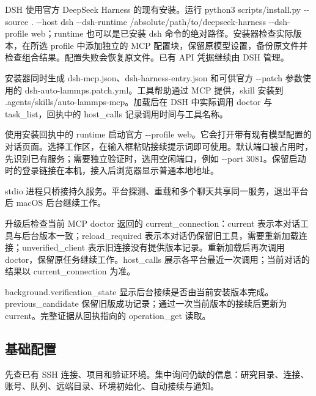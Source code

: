 \documentclass[11pt,a4paper]{ctexart}
\begin{document}
DSH 使用官方 DeepSeek Harness 的现有安装。运行 python3 scripts/\allowbreak{}install.py -{}-source . -{}-host dsh -{}-dsh-runtime /\allowbreak{}absolute/\allowbreak{}path/\allowbreak{}to/\allowbreak{}deepseek-harness -{}-dsh-profile web；runtime 也可以是已安装 dsh 命令的绝对路径。安装器检查实际版本，在所选 profile 中添加独立的 MCP 配置块，保留原模型设置，备份原文件并检查组合结果。配置失败会恢复原文件。已有 API 凭据继续由 DSH 管理。



安装器同时生成 dsh-mcp.json、dsh-harness-entry.json 和可供官方 -{}-patch 参数使用的 dsh-auto-lammps.patch.yml。工具帮助通过 MCP 提供，skill 安装到 .agents/\allowbreak{}skills/\allowbreak{}auto-lammps-mcp。加载后在 DSH 中实际调用 doctor 与 task\_\allowbreak{}list，回执中的 host\_\allowbreak{}calls 记录调用时间与工具名称。



使用安装回执中的 runtime 启动官方 -{}-profile web。它会打开带有现有模型配置的对话页面。选择工作区，在输入框粘贴接续提示词即可使用。默认端口被占用时，先识别已有服务；需要独立验证时，选用空闲端口，例如 -{}-port 3081。保留启动时的登录链接在本机，接入后浏览器显示普通本地地址。



stdio 进程只桥接持久服务。平台探测、重载和多个聊天共享同一服务，退出平台后 macOS 后台继续工作。



升级后检查当前 MCP doctor 返回的 current\_\allowbreak{}connection：current 表示本对话工具与后台版本一致；reload\_\allowbreak{}required 表示本对话仍保留旧工具，需要重新加载连接；unverified\_\allowbreak{}client 表示旧连接没有提供版本记录。重新加载后再次调用 doctor，保留原任务继续工作。host\_\allowbreak{}calls 展示各平台最近一次调用；当前对话的结果以 current\_\allowbreak{}connection 为准。



background.verification\_\allowbreak{}state 显示后台接续是否由当前安装版本完成。previous\_\allowbreak{}candidate 保留旧版成功记录；通过一次当前版本的接续后更新为 current。完整证据从回执指向的 operation\_\allowbreak{}get 读取。



\subsection{基础配置}


先查已有 SSH 连接、项目和验证环境。集中询问仍缺的信息：研究目录、连接、账号、队列、远端目录、环境初始化、自动接续与通知。
\end{document}
